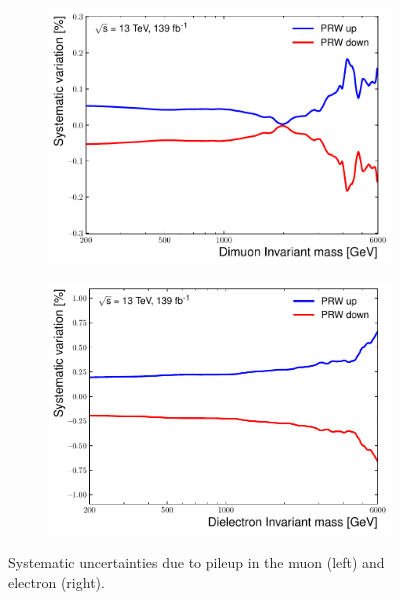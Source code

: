 \begin{figure}[h!]
    \centering
    \begin{subfigure}[h]{0.42\textwidth}
        \includegraphics[width=\textwidth]{figures/analysis/datamc/Uncertainties/exp/mm/m_uu_pstOR_PRW_DATASF__1up.pdf}
        \label{fig:uncert:mmprw}
    \end{subfigure}
    \begin{subfigure}[h]{0.42\textwidth}
        \centering
        \includegraphics[width=\textwidth]{figures/analysis/datamc/Uncertainties/exp/ee/m_ee_pstOR_PRW_DATASF__1up.pdf}
        \label{fig:uncert:eeprw}
    \end{subfigure}
    \caption[Systematic uncertainty due to pileup reweighting]{Systematic uncertainties due to pileup in the muon (left) and electron (right).}
    \label{fig:uncert:prwuncert}
\end{figure}

